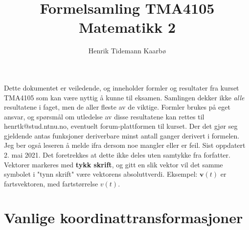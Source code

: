 \documentclass[fleqn,12pt]{wlscirep}
\title{Formelsamling TMA4105 Matematikk 2}
\author[1, 2]{Henrik Tidemann Kaarbø}
\affil[1]{Norges Teknisk-Naturvitenskapelige Universitet}
\affil[2]{Timini, linjeforeningen for teknologistudiet nanoteknologi}
\begin{document}
\flushbottom
\maketitle
\thispagestyle{empty}
\vskip 20pt
\vskip 2pt
\noindent Dette dokumentet er veiledende, og inneholder formler og resultater fra kurset TMA4105 som kan være nyttig å kunne til eksamen. Samlingen dekker ikke \textit{alle} resultatene i faget, men de aller fleste av de viktige. Formler brukes på eget ansvar, og spørsmål om utledelse av disse resultatene kan rettes til henrtk@stud.ntnu.no, eventuelt forum-plattformen til kurset. Der det gjør seg gjeldende antas funksjoner deriverbare minst antall ganger derivert i formelen. Jeg ber også leseren å melde ifra dersom noe mangler eller er feil. Sist oppdatert 2. mai 2021. Det foretrekkes at dette ikke deles uten samtykke fra forfatter. Vektorer markeres med \textbf{tykk skrift}, og gitt en slik vektor vil det samme symbolet i "tynn skrift" være vektorens absoluttverdi. Eksempel: $\textbf{v}(t)$ er fartsvektoren, med fartstørrelse $v(t)$. 
\tableofcontents

\section{Vanlige koordinattransformasjoner}
\end{document}
